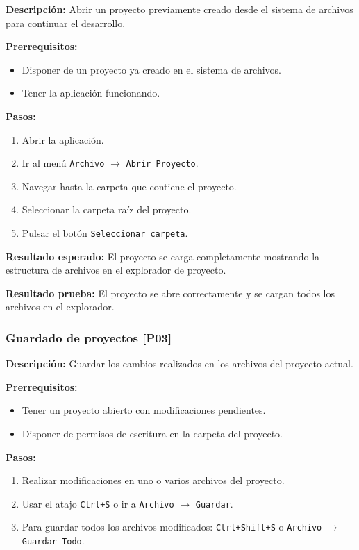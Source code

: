 \documentclass[../../main.tex]{subfiles}
\begin{document}
\textbf{Descripción:} Abrir un proyecto previamente creado desde el sistema de archivos para continuar el desarrollo.

\textbf{Prerrequisitos:} 
\begin{itemize}
\item Disponer de un proyecto ya creado en el sistema de archivos.
\item Tener la aplicación funcionando.
\end{itemize}

\textbf{Pasos:} 
\begin{enumerate}
\item Abrir la aplicación.
\item Ir al menú \lstinline|Archivo| $\rightarrow$ \lstinline|Abrir Proyecto|.
\item Navegar hasta la carpeta que contiene el proyecto.
\item Seleccionar la carpeta raíz del proyecto.
\item Pulsar el botón \lstinline|Seleccionar carpeta|.
\end{enumerate}

\textbf{Resultado esperado:} El proyecto se carga completamente mostrando la estructura de archivos en el explorador de proyecto.

\textbf{Resultado prueba:} El proyecto se abre correctamente y se cargan todos los archivos en el explorador.

\subsubsection{Guardado de proyectos [P03]}

\textbf{Descripción:} Guardar los cambios realizados en los archivos del proyecto actual.

\textbf{Prerrequisitos:} 
\begin{itemize}
\item Tener un proyecto abierto con modificaciones pendientes.
\item Disponer de permisos de escritura en la carpeta del proyecto.
\end{itemize}

\textbf{Pasos:}
\begin{enumerate}
\item Realizar modificaciones en uno o varios archivos del proyecto.
\item Usar el atajo \lstinline|Ctrl+S| o ir a \lstinline|Archivo| $\rightarrow$ \lstinline|Guardar|.
\item Para guardar todos los archivos modificados: \lstinline|Ctrl+Shift+S| o \lstinline|Archivo| $\rightarrow$ \lstinline|Guardar Todo|.
\end{enumerate}
\end{document}
